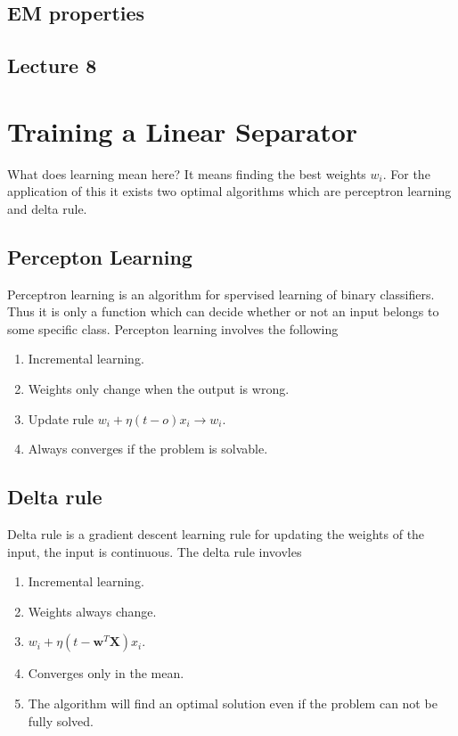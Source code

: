 \documentclass[12pt]{article}
\numberwithin{equation}{section}
\begin{document}
\subsection{EM properties}










\subsection{Lecture 8}
\section{Training a Linear Separator}
What does learning mean here? It means finding the best weights $w_i$. For the application of this it exists two optimal algorithms which are perceptron learning and delta rule.

\subsection{Percepton Learning}
Perceptron learning is an algorithm for spervised learning of binary classifiers. Thus it is only a function which can decide whether or not an input belongs to some specific class. Percepton learning involves the following
\begin{enumerate}
    \item Incremental learning.
    \item Weights only change when the output is wrong.
    \item Update rule $w_i + \eta (t-o)x_i \to w_i$.
    \item Always converges if the problem is solvable.
\end{enumerate}
\subsection{Delta rule}
Delta rule is a gradient descent learning rule for updating the weights of the input, the input is continuous. The delta rule invovles
\begin{enumerate}
    \item Incremental learning.
    \item Weights always change.
    \item $w_i + \eta (t-\bm{w}^T \bm{X})x_i$.
    \item Converges only in the mean.
    \item The algorithm will find an optimal solution even if the problem can not be fully solved.
\end{enumerate}
\end{document}
